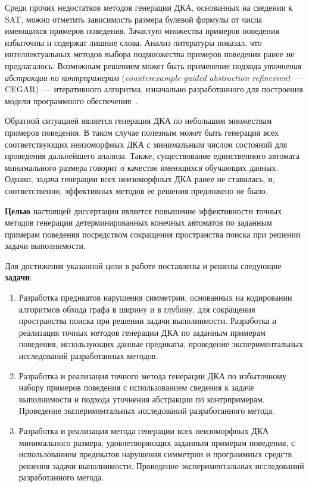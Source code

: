 Среди прочих недостатков методов генерации ДКА, основанных на сведении к SAT, можно отметить зависимость размера булевой формулы от числа имеющихся примеров поведения.
Зачастую множества примеров поведения избыточны и содержат лишние слова.
Анализ литературы показал, что интеллектуальных методов выбора подмножества примеров поведения ранее не предлагалось.
Возможным решением может быть применение подхода \emph{уточнения абстракции по контрпримерам} (\emph{counterexample-guided abstraction refinement}~--- CEGAR)~--- итеративного алгоритма, изначально разработанного для построения модели программного обеспечения~\cite{DBLP:conf/cav/ClarkeGJLV00,мандрыкин2013введение}.

Обратной ситуацией является генерация ДКА по небольшим множествам примеров поведения.
В таком случае полезным может быть генерация всех соответствующих неизоморфных ДКА с минимальным числом состояний для проведения дальнейшего анализа.
Также, существование единственного автомата минимального размера говорит о качестве имеющихся обучающих данных.
Однако, задача генерации всех неизоморфных ДКА ранее не ставилась, и, соответственно, эффективных методов ее решения предложено не было.

\textbf{Целью} настоящей диссертации является повышение эффективности точных методов генерации детерминированных конечных автоматов по заданным примерам поведения посредством сокращения пространства поиска при решении задачи выполнимости.

Для достижения указанной цели в работе поставлены и решены следующие \textbf{задачи}:
\begin{enumerate}
  \item Разработка предикатов нарушения симметрии, основанных на кодировании алгоритмов обхода графа в ширину и в глубину, для сокращения пространства поиска при решении задачи выполнимости.
  Разработка и реализация точных методов генерации ДКА по заданным примерам поведения, использующих данные предикаты, проведение экспериментальных исследований разработанных методов.

  \item Разработка и реализация точного метода генерации ДКА по избыточному набору примеров поведения с использованием сведения к задаче выполнимости и подхода уточнения абстракции по контрпримерам.
  Проведение экспериментальных исследований разработанного метода.
  
  \item Разработка и реализация метода генерации всех неизоморфных ДКА минимального размера, удовлетворяющих заданным примерам поведения, с использованием предикатов нарушения симметрии и программных средств решения задачи выполнимости.
  Проведение экспериментальных исследований разработанного метода.
\end{enumerate}

